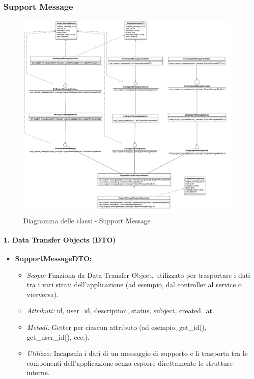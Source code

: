    \subsubsection{Support Message}

    \begin{figure}[H]
        \centering
        \includegraphics[width=\linewidth, height=0.8\textheight, keepaspectratio]{./img/SupportMessage.png}
        \caption{Diagramma delle classi - Support Message}
        \label{fig:support_message}
    \end{figure}

    \paragraph{1. Data Transfer Objects (DTO)}
    \begin{itemize}
        \item \textbf{SupportMessageDTO:}
        \begin{itemize}
            \item \textit{Scopo:} Funziona da Data Transfer Object, utilizzato per trasportare i dati tra i vari strati dell’applicazione (ad esempio, dal controller al service o viceversa).
            \item \textit{Attributi:} id, user\_id, description, status, subject, created\_at.
            \item \textit{Metodi:} Getter per ciascun attributo (ad esempio, get\_id(), get\_user\_id(), ecc.).
            \item \textit{Utilizzo:} Incapsula i dati di un messaggio di supporto e li trasporta tra le componenti dell’applicazione senza esporre direttamente le strutture interne.
        \end{itemize}
    \end{itemize}

